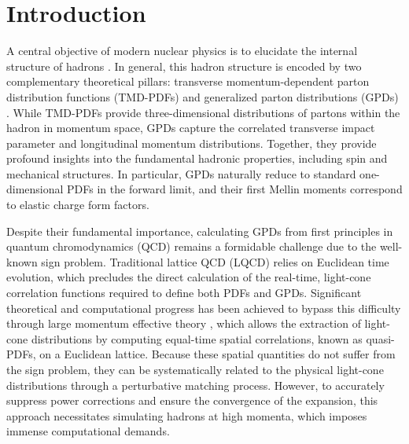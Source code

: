\documentclass[aps,prd,twocolumn,superscriptaddress,notitlepage,nofootinbib,preprintnumbers]{revtex4-1}
\begin{document}
\section{Introduction}
A central objective of modern nuclear physics is to elucidate the internal structure of hadrons \cite{Accardi:2012qut,AbdulKhalek:2021gbh,Anderle:2021wcy,CAO:2024fdz}. In general, this hadron structure is encoded by two complementary theoretical pillars: transverse momentum-dependent parton distribution functions (TMD-PDFs) \cite{Boussarie:2023izj} and generalized parton distributions (GPDs) \cite{Diehl:2003ny,Belitsky:2005qn,Ji:2016djn}. While TMD-PDFs provide three-dimensional distributions of partons within the hadron in momentum space, GPDs capture the correlated transverse impact parameter and longitudinal momentum distributions. Together, they provide profound insights into the fundamental hadronic properties, including spin and mechanical structures. In particular, GPDs naturally reduce to standard one-dimensional PDFs in the forward limit, and their first Mellin moments correspond to elastic charge form factors. 

Despite their fundamental importance, calculating GPDs from first principles in quantum chromodynamics (QCD) remains a formidable challenge due to the well-known sign problem. Traditional lattice QCD (LQCD) relies on Euclidean time evolution, which precludes the direct calculation of the real-time, light-cone correlation functions required to define both PDFs and GPDs. Significant theoretical and computational progress has been achieved to bypass this difficulty through large momentum effective theory \cite{Ji:2013dva, Ji:2020ect}, which allows the extraction of light-cone distributions by computing equal-time spatial correlations, known as quasi-PDFs, on a Euclidean lattice. Because these spatial quantities do not suffer from the sign problem, they can be systematically related to the physical light-cone distributions through a perturbative matching process. However, to accurately suppress power corrections and ensure the convergence of the expansion, this approach necessitates simulating hadrons at high momenta, which imposes immense computational demands.
\end{document}
